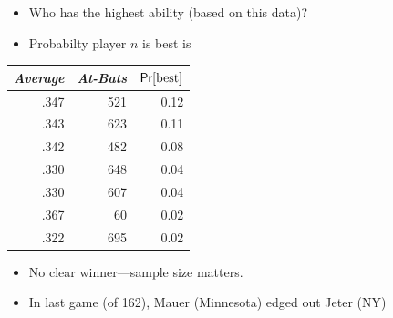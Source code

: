 \documentclass[10pt]{report}
\begin{document}
\vspace*{-2pt}\small
\begin{itemize}
\item Who has the highest ability (based on this data)?
\item Probabilty player $n$ is best is 
\end{itemize}
%
\begin{center}
{\small
\begin{tabular}{rrr}
\emph{Average} & \emph{At-Bats} & $\text{\sf Pr}[\text{best}]$
\\ \hline
.347 & 521 & 0.12
\\
.343 & 623 & 0.11
\\
.342 & 482 & 0.08
\\
.330 & 648 & 0.04
\\
.330 & 607 & 0.04
\\
.367 & 60 & 0.02
\\
.322 & 695 & 0.02
\end{tabular}
}
\end{center}
\begin{itemize}
\item No clear winner---sample size matters.
\item In last game (of 162), Mauer (Minnesota) edged out Jeter (NY)
\end{itemize}

\end{document}
